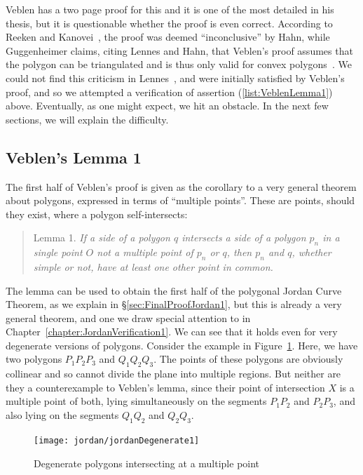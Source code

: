 Veblen has a two page proof for this and it is one of the most detailed in his thesis, but it is questionable whether the proof is even correct. According to Reeken and Kanovei~\cite{HahnInconclusiveIndirect}, the proof was deemed ``inconclusive'' by Hahn, while Guggenheimer claims, citing Lennes and Hahn, that Veblen's proof assumes that the polygon can be triangulated and is thus only valid for convex polygons~\cite{GuggenheimerJordanCurve}. We could not find this criticism in Lennes~\cite{LennesPolygon}, and were initially satisfied by Veblen's proof, and so we attempted a verification of assertion (\ref{list:VeblenLemma1}) above. Eventually, as one might expect, we hit an obstacle. In the next few sections, we will explain the difficulty.

\subsection{Veblen's Lemma 1}\label{sec:VeblenLemma1}
The first half of Veblen's proof is given as the corollary to a very general theorem about polygons, expressed in terms of ``multiple points''. These are points, should they exist, where a polygon self-intersects:
\begin{quote}
Lemma 1. \emph{If a side of a polygon $q$ intersects a side of a polygon $p_n$ in a single point $O$ not a multiple point of $p_n$ or $q$, then $p_n$ and $q$, whether simple or not, have at least one other point in common.} 
\end{quote}

The lemma can be used to obtain the first half of the polygonal Jordan Curve Theorem, as we explain in \S\ref{sec:FinalProofJordan1}, but this is already a very general theorem, and one we draw special attention to in Chapter~\ref{chapter:JordanVerification1}. We can see that it holds even for very degenerate versions of polygons. Consider the example in Figure~\ref{fig:jordanDegenerate1}. Here, we have two polygons $P_1P_2P_3$ and $Q_1Q_2Q_3$. The points of these polygons are obviously collinear and so cannot divide the plane into multiple regions. But neither are they a counterexample to Veblen's lemma, since their point of intersection $X$ is a multiple point of both, lying simultaneously on the segments $P_1P_2$ and $P_2P_3$, and also lying on the segments $Q_1Q_2$ and $Q_2Q_3$.

\begin{figure}
\centering
\texttt{[image: jordan/jordanDegenerate1]}
\caption{Degenerate polygons intersecting at a multiple point}
\label{fig:jordanDegenerate1}
\end{figure}

